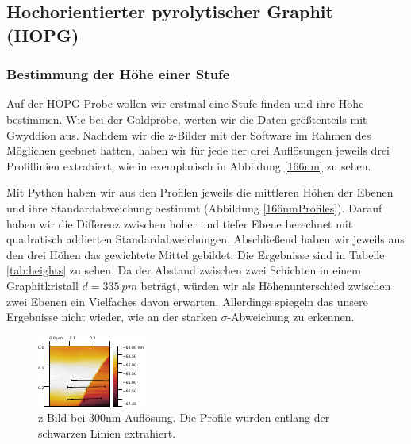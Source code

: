 \subsection{Hochorientierter pyrolytischer Graphit (HOPG)}
\subsubsection{Bestimmung der Höhe einer Stufe}

Auf der HOPG Probe wollen wir erstmal eine Stufe finden und ihre Höhe bestimmen. Wie bei der Goldprobe, werten wir die Daten größtenteils mit Gwyddion aus. Nachdem wir die z-Bilder mit der Software im Rahmen des Möglichen geebnet hatten, haben wir für jede der drei Auflösungen jeweils drei Profillinien extrahiert, wie in exemplarisch in Abbildung \ref{166nm} zu sehen.

Mit Python haben wir aus den Profilen jeweils die mittleren Höhen der Ebenen und ihre Standardabweichung bestimmt (Abbildung \ref{166nmProfiles}). Darauf haben wir die Differenz zwischen hoher und tiefer Ebene berechnet mit quadratisch addierten Standardabweichungen. Abschließend haben wir jeweils aus den drei Höhen das gewichtete Mittel gebildet. Die Ergebnisse sind in Tabelle \ref{tab:heights} zu sehen. Da der Abstand zwischen zwei Schichten in einem Graphitkristall $d = \SI{335}{pm}$ beträgt, würden wir als Höhenunterschied zwischen zwei Ebenen ein Vielfaches davon erwarten. Allerdings spiegeln das unsere Ergebnisse nicht wieder, wie an der starken $\sigma$-Abweichung zu erkennen.

\begin{figure}[H]
\centering
\includegraphics[width=\textwidth]{../Gwyddion/HOPG/300nm.pdf}
\caption{z-Bild bei {300}{nm}-Auflösung. Die Profile wurden entlang der schwarzen Linien extrahiert.}
\label{300nm}
\end{figure}	

